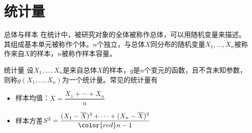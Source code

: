 
\section{统计量}


\begin{frame}

\begin{block}{总体与样本}
在统计中，被研究对象的全体被称作总体，可以用随机变量来描述。其组成基本单元被称作个体。$n$个独立，与总体$X$同分布的随机变量$X_1,\ldots,X_n$被称作来自$X$的样本，$n$被称作样本容量。
\end{block}

\vspace{1em}
\pause

\begin{block}{统计量}
设$X_1,\ldots,X_n$是来自总体$X$的样本，$g$是$n$个变元的函数，且不含未知参数，则称$g(X_1,\ldots,X_n)$为一个统计量。常见的统计量有
\begin{itemize}
\item 样本均值：$\overline{X} = \dfrac{X_1 + \cdots + X_n}{n}$
\item 样本方差$S^2 = \dfrac{(X_1-\overline{X})^2 + \cdots + (X_n-\overline{X})^2}{\color{red} n-1}$
\end{itemize}
\end{block}

\end{frame}









